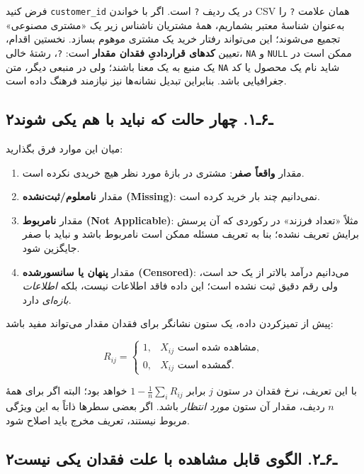 \documentclass[12pt,a4paper,oneside]{book}
\providecommand{\tightlist}{\setlength{\itemsep}{0pt}\setlength{\parskip}{0pt}}
\begin{document}
فرض کنید \texttt{customer\_id} در یک ردیف \texttt{?} است. اگر با خواندن CSV همان علامت \texttt{?} را به‌عنوان شناسهٔ معتبر بشماریم، همهٔ مشتریان ناشناس زیر یک «مشتری مصنوعی» تجمیع می‌شوند؛ این می‌تواند رفتار خرید یک مشتری موهوم بسازد. نخستین اقدام، تعیین \textbf{کدهای قراردادیِ فقدان مقدار} است: \texttt{?}، رشتهٔ خالی، \texttt{NA} و \texttt{NULL} ممکن است در یک منبع به یک معنا باشند؛ ولی در منبعی دیگر، متن \texttt{NA} شاید نام یک محصول یا کد جغرافیایی باشد. بنابراین تبدیل نشانه‌ها نیز نیازمند فرهنگ داده است.

\subsection{۲ـ۶ـ۱. چهار حالت که نباید با هم یکی شوند}\label{ux640ux6f6ux640ux6f1.-ux686ux647ux627ux631-ux62dux627ux644ux62a-ux6a9ux647-ux646ux628ux627ux6ccux62f-ux628ux627-ux647ux645-ux6ccux6a9ux6cc-ux634ux648ux646ux62f}

میان این موارد فرق بگذارید:

\begin{enumerate}
\def\labelenumi{\arabic{enumi}.}
\tightlist
\item
  مقدار \textbf{واقعاً صفر}: مشتری در بازهٔ مورد نظر هیچ خریدی نکرده است.
\item
  مقدار \textbf{نامعلوم/ثبت‌نشده (Missing)}: نمی‌دانیم چند بار خرید کرده است.
\item
  مقدار \textbf{نامربوط (Not Applicable)}: مثلاً «تعداد فرزند» در رکوردی که آن پرسش برایش تعریف نشده؛ بنا به تعریف مسئله ممکن است نامربوط باشد و نباید با صفر جایگزین شود.
\item
  مقدار \textbf{پنهان یا سانسورشده (Censored)}: می‌دانیم درآمد بالاتر از یک حد است، ولی رقم دقیق ثبت نشده است؛ این داده فاقد اطلاعات نیست، بلکه \emph{اطلاعات بازه‌ای} دارد.
\end{enumerate}

پیش از تمیزکردن داده، یک ستون نشانگر برای فقدان مقدار می‌تواند مفید باشد:

\[
R_{ij}=\begin{cases}1,&X_{ij}\text{ مشاهده شده است},\\0,&X_{ij}\text{ گمشده است}.
\end{cases}
\]

با این تعریف، نرخ فقدان در ستون \(j\) برابر \(1-\frac1n\sum_i R_{ij}\) خواهد بود؛ البته اگر برای همهٔ \(n\) ردیف، مقدار آن ستون \emph{مورد انتظار} باشد. اگر بعضی سطرها ذاتاً به این ویژگی مربوط نیستند، تعریف مخرج باید اصلاح شود.

\subsection{۲ـ۶ـ۲. الگوی قابل مشاهده با علت فقدان یکی نیست}\label{ux640ux6f6ux640ux6f2.-ux627ux644ux6afux648ux6cc-ux642ux627ux628ux644-ux645ux634ux627ux647ux62fux647-ux628ux627-ux639ux644ux62a-ux641ux642ux62fux627ux646-ux6ccux6a9ux6cc-ux646ux6ccux633ux62a}
\end{document}
